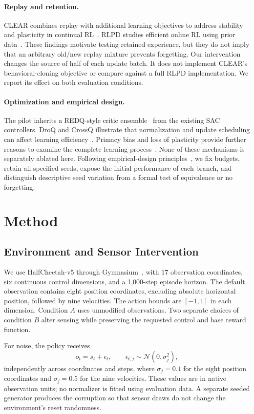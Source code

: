 \documentclass[runningheads]{llncs}
\begin{document}
\paragraph{Replay and retention.}
CLEAR combines replay with additional learning objectives to address stability and plasticity in continual RL~\cite{clear}. RLPD studies efficient online RL using prior data~\cite{rlpd}. These findings motivate testing retained experience, but they do not imply that an arbitrary old/new replay mixture prevents forgetting. Our intervention changes the source of half of each update batch. It does not implement CLEAR's behavioral-cloning objective or compare against a full RLPD implementation. We report its effect on both evaluation conditions.

\paragraph{Optimization and empirical design.}
The pilot inherits a REDQ-style critic ensemble~\cite{redq} from the existing SAC controllers. DroQ and CrossQ illustrate that normalization and update scheduling can affect learning efficiency~\cite{droq,crossq}. Primacy bias and loss of plasticity provide further reasons to examine the complete learning process~\cite{primacy,plasticity}. None of these mechanisms is separately ablated here. Following empirical-design principles~\cite{empirical}, we fix budgets, retain all specified seeds, expose the initial performance of each branch, and distinguish descriptive seed variation from a formal test of equivalence or no forgetting.

\section{Method}
\subsection{Environment and Sensor Intervention}
We use HalfCheetah-v5 through Gymnasium~\cite{gym}, with 17 observation coordinates, six continuous control dimensions, and a 1,000-step episode horizon. The default observation contains eight position coordinates, excluding absolute horizontal position, followed by nine velocities. The action bounds are $[-1,1]$ in each dimension. Condition $A$ uses unmodified observations. Two separate choices of condition $B$ alter sensing while preserving the requested control and base reward function.

For noise, the policy receives
\begin{equation}
 o_t=s_t+\epsilon_t,\qquad
 \epsilon_{t,j}\sim\mathcal{N}(0,\sigma_j^2),
\end{equation}
independently across coordinates and steps, where $\sigma_j=0.1$ for the eight position coordinates and $\sigma_j=0.5$ for the nine velocities. These values are in native observation units; no normalizer is fitted using evaluation data. A separate seeded generator produces the corruption so that sensor draws do not change the environment's reset randomness.
\end{document}
